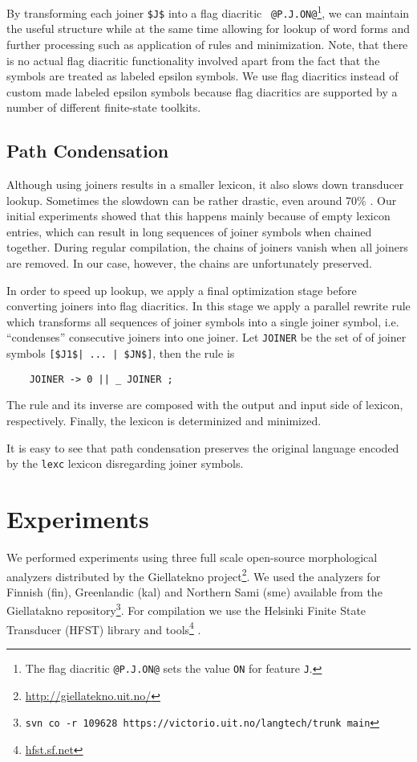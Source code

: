 \documentclass[11pt]{article}
\begin{document}
By transforming each joiner {\tt \$J\$} into a flag diacritic {\tt
  @P.J.ON@}\footnote{The flag diacritic {\tt @P.J.ON@} sets the value
  {\tt ON} for feature {\tt J}.}, we can
maintain the useful structure while at the same time allowing for
lookup of word forms and further processing such as application of
rules and minimization. Note, that there is no actual flag diacritic
functionality involved apart from the fact that the symbols are
treated as labeled epsilon symbols. We use flag diacritics instead of
custom made labeled epsilon symbols because flag diacritics are
supported by a number of different finite-state toolkits.

\subsection{Path Condensation}

Although using joiners results in a smaller lexicon, it also slows down transducer lookup. Sometimes the slowdown can be rather drastic, even around 70\% \cite{drobac2014}.  Our initial experiments showed that this happens mainly because of empty lexicon entries, which can result in long sequences of joiner symbols when chained together. During regular compilation, the chains of joiners vanish when all joiners are removed. In our case, however, the chains are unfortunately preserved.

In order to speed up lookup, we apply a final optimization stage before converting joiners into flag diacritics. In this stage we apply a parallel rewrite rule which transforms all sequences of joiner symbols into a single joiner symbol, i.e. ``condenses'' consecutive joiners into one joiner. Let {\tt JOINER} be the set of of joiner symbols {\tt [\$J1\$| ... | \$JN\$]}, then the rule is
\begin{verbatim} 
    JOINER -> 0 || _ JOINER ;
\end{verbatim}
The rule and its inverse are composed with the output and input side of lexicon, respectively. Finally, the lexicon is determinized and minimized.

It is easy to see that path condensation preserves the original language encoded by the {\tt lexc} lexicon disregarding joiner symbols.

\section{Experiments}\label{sec:experiments}
We performed experiments using three full scale open-source
morphological analyzers distributed by the Giellatekno
project\footnote{\url{http://giellatekno.uit.no/}}. We used the analyzers
for Finnish (fin), Greenlandic (kal) and Northern
Sami (sme) available from the Giellatakno repository\footnote{{\tt svn
    co -r 109628 https://victorio.uit.no/langtech/trunk main}}. For
compilation we use the Helsinki Finite State Transducer (HFST) library
and tools\footnote{\url{hfst.sf.net}} \cite{linden2011}.
\end{document}

